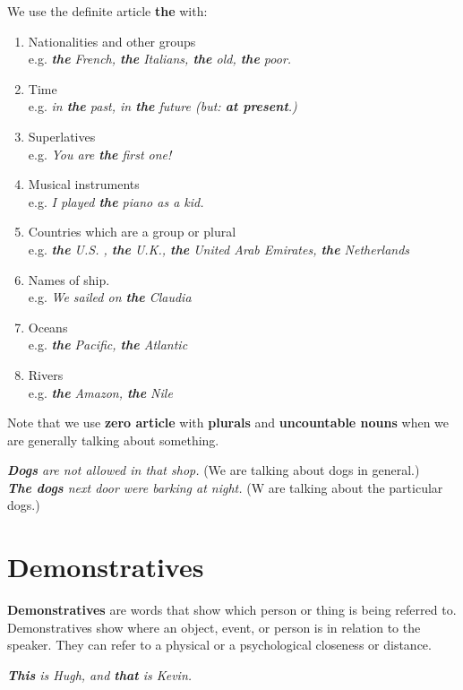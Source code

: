 \documentclass[hidelinks,10pt,a4paper]{article}
\begin{document}
We use the definite article \textbf{the} with:
\begin{enumerate}[label=\alph*)]
\item Nationalities and other groups\\
		e.g. \textit{ \textbf{the} French, \textbf{the} Italians, \textbf{the} old, \textbf{the} poor.}
\item Time\\
		e.g. \textit{in \textbf{the} past, in \textbf{the} future (but: \textbf{at present}.)}
\item Superlatives\\
		e.g. \textit{You are \textbf{the} first one!}
\item Musical instruments\\
		e.g. \textit{I played \textbf{the} piano as a kid.}
\item Countries which are a group or plural\\
		e.g. \textit{ \textbf{the} U.S. , \textbf{the} U.K., \textbf{the} United Arab Emirates, \textbf{the} Netherlands }
\item Names of ship.\\
		e.g. \textit{We sailed on \textbf{the} Claudia}
\item Oceans\\
		e.g. \textit{ \textbf{the} Pacific, \textbf{the} Atlantic}
\item Rivers\\
		e.g. \textit{ \textbf{the} Amazon, \textbf{the} Nile}
\end{enumerate}

Note that we use \textbf{zero article} with \textbf{plurals} and \textbf{uncountable nouns} when we are generally talking about something.
\begin{center}
		\textit{ \textbf{Dogs} are not allowed in that shop.} (We are talking about dogs in general.)\\
		\textit{ \textbf{The dogs} next door were barking at night.} (W are talking about the particular dogs.)
\end{center}

\section{Demonstratives}

\textbf{Demonstratives} are words that show which person or thing is being referred to.
Demonstratives show where an object, event, or person is in relation to the speaker. They can refer to a physical or a psychological closeness or distance.
\begin{center}
		\textit{\textbf{This} is Hugh, and \textbf{that} is Kevin.}
\end{center}
\end{document}

